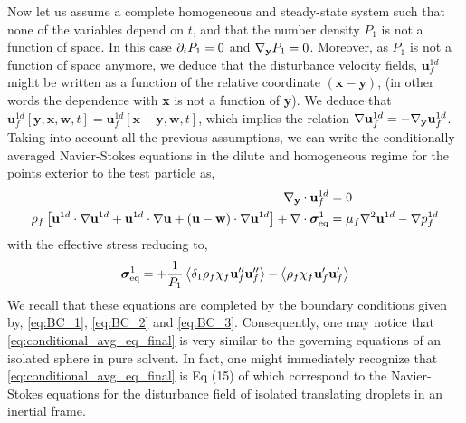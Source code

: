 Now let us assume a complete homogeneous and steady-state system such that none of the variables depend on $t$, and that the number density $P_1$ is not a function of space. 
In this case $\partial_t P_1 = 0$ and ${\mathbf{\nabla}_\textbf{y}} P_1 = 0$. 
Moreover, as $P_1$ is not a function of space anymore, we deduce that the disturbance velocity fields, $\textbf{u}_f^{1d}$ might be written as a function of the relative coordinate $(\textbf{x} - \textbf{y})$, (in other words the dependence with \textbf{x} is not a function of \textbf{y}). 
We deduce that $\textbf{u}_f^{1d}[\textbf{y},\textbf{x},\textbf{w},t] = \textbf{u}_f^{1d}[\textbf{x}-\textbf{y},\textbf{w},t]$, which implies the relation  $\mathbf{\nabla} \textbf{u}_f^{1d} = - {\mathbf{\nabla}_\textbf{y}} \textbf{u}^{1d}_f$.
Taking into account all the previous assumptions, we can write the conditionally-averaged Navier-Stokes equations in the dilute and homogeneous regime for the points exterior to the test particle as, 
\begin{align}
    \pddy \cdot \textbf{u}^{1d}_f &= 0 \\
    \rho_f \left[
        \textbf{u}^{1d}\cdot \grad\textbf{u}^{1d} 
        +  \textbf{u}^{1d}\cdot \grad\textbf{u} 
        +  (\textbf{u} - \textbf{w})\cdot \grad\textbf{u}^{1d}
    \right]
    + \div \bm\sigma^1_\text{eq}
    &=
        \mu_f \grad^2 \textbf{u}^{1d}  
        - \grad p_f^{1d} 
    \label{eq:conditional_avg_eq_final}
\end{align}
with the effective stress reducing to,
\begin{equation*}
    \bm\sigma^1_\text{eq}
    =
    + \frac{1}{P_1}\left<\delta_1\rho_f\chi_f\textbf{u}_f''\textbf{u}_f''\right>
    - \left<\rho_f\chi_f\textbf{u}_f'\textbf{u}_f'\right>
\end{equation*}
We recall that these equations are completed by the boundary conditions given by, \ref{eq:BC_1}, \ref{eq:BC_2} and \ref{eq:BC_3}.
Consequently, one may notice that \ref{eq:conditional_avg_eq_final} is very similar to the governing equations of an isolated sphere in pure solvent. 
In fact, one might immediately recognize that \ref{eq:conditional_avg_eq_final} is Eq (15) of \citep{maxey1983equation} which correspond to the Navier-Stokes equations for the disturbance field of isolated translating droplets in an inertial frame. 
